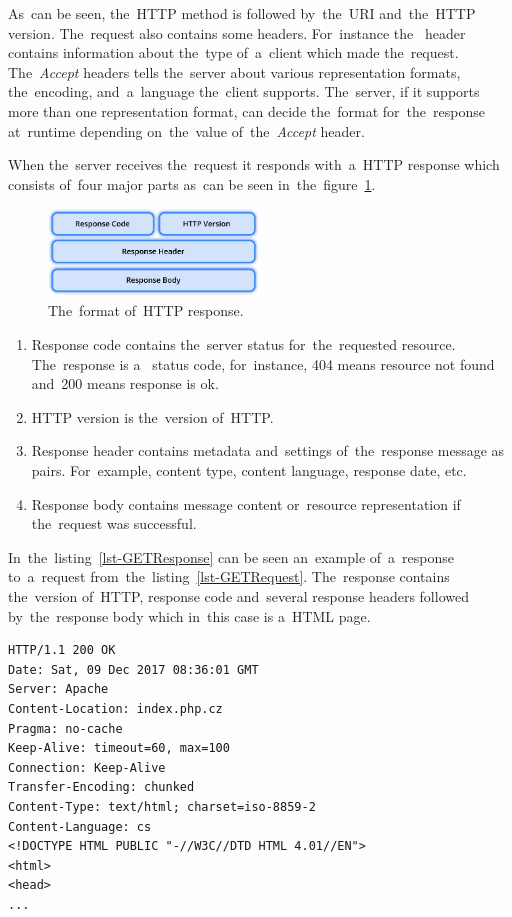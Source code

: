 As~can be seen, the~HTTP method is followed by~the~URI and~the~HTTP version.
The~request also contains some headers. For~instance
the~ header contains information about the~type
of~a~client which made the~request. The~\textit{Accept} headers tells the~server
about various representation formats, the~encoding, and~a~language the~client
supports. The~server, if it supports more than one representation format, can
decide the~format for~the~response at~runtime depending on~the~value
of~the~\textit{Accept} header.

When the~server receives the~request it responds with~a~HTTP response which
consists of~four major parts as~can be seen
in~the~figure~\ref{fig-HTTPResponse}.

\begin{figure}[!hbt]
	\centering
	\includegraphics[width=0.5\textwidth]{./figures/http-response.pdf}
	\caption{The~format of~HTTP response.}
	\label{fig-HTTPResponse}
\end{figure}

\begin{enumerate}
  \item Response code contains the~server status for~the~requested resource.
  The~response is a~ status code, for~instance, 404 means resource
  not found and~200 means response is ok.
  \item HTTP version is the~version of~HTTP.
  \item Response header contains metadata and~settings of~the~response message
  as~ pairs. For~example, content type, content language,
  response date, etc.
  \item Response body contains message content or~resource representation if
  the~request was successful.
\end{enumerate}

In~the~listing~\ref{lst-GETResponse} can be seen an~example of~a~response
to~a~request from~the~listing~\ref{lst-GETRequest}. The~response contains
the~version of~HTTP, response code and~several response headers followed
by~the~response body which in~this case is a~HTML page.

\vspace{1mm}
\begin{lstlisting}[caption=An~example of~a~simplified response to~GET
request., label=lst-GETResponse, style=dp-html]
HTTP/1.1 200 OK
Date: Sat, 09 Dec 2017 08:36:01 GMT
Server: Apache
Content-Location: index.php.cz
Pragma: no-cache
Keep-Alive: timeout=60, max=100
Connection: Keep-Alive
Transfer-Encoding: chunked
Content-Type: text/html; charset=iso-8859-2
Content-Language: cs
<!DOCTYPE HTML PUBLIC "-//W3C//DTD HTML 4.01//EN">
<html>
<head>
...
\end{lstlisting}




